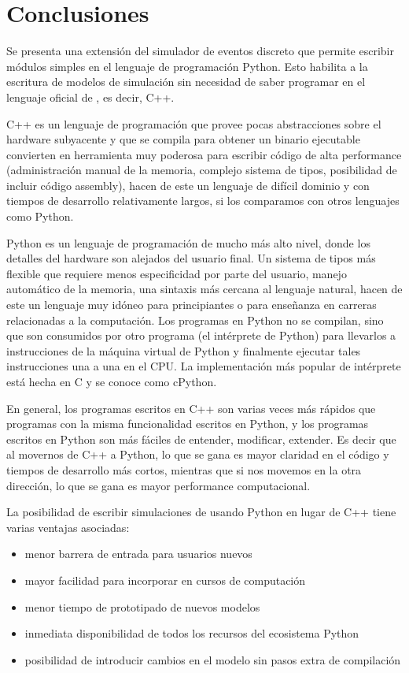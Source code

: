 \chapter{Conclusiones}\label{sec:conc}
Se presenta una extensión del simulador de eventos discreto \omnetpp{} que permite
escribir módulos simples en el lenguaje de programación Python. Esto habilita a
la escritura de modelos de simulación sin necesidad de saber programar en el
lenguaje oficial de \omnetpp{}, es decir, C++.

C++ es un lenguaje de programación que provee pocas abstracciones sobre el
hardware subyacente y que se compila para obtener un binario ejecutable
convierten en herramienta muy poderosa para escribir código de alta performance
(administración manual de la memoria, complejo sistema de tipos, posibilidad de
incluir código assembly), hacen de este un lenguaje de difícil dominio y con
tiempos de desarrollo relativamente largos, si los comparamos con otros
lenguajes como Python.

Python es un lenguaje de programación de mucho más alto nivel, donde los
detalles del hardware son alejados del usuario final. Un sistema de tipos más
flexible que requiere menos especificidad por parte del usuario, manejo
automático de la memoria, una sintaxis más cercana al lenguaje natural, hacen
de este un lenguaje muy idóneo para principiantes o para enseñanza en carreras
relacionadas a la computación. Los programas en Python no se compilan, sino que
son consumidos por otro programa (el intérprete de Python) para llevarlos a
instrucciones de la máquina virtual de Python y finalmente ejecutar tales
instrucciones una a una en el CPU. La implementación más popular de intérprete
está hecha en C y se conoce como cPython.

En general, los programas escritos en C++ son varias veces más rápidos que
programas con la misma funcionalidad escritos en Python, y los programas
escritos en Python son más fáciles de entender, modificar, extender. Es decir
que al movernos de C++ a Python, lo que se gana es mayor claridad en el código
y tiempos de desarrollo más cortos, mientras que si nos movemos en la otra
dirección, lo que se gana es mayor performance computacional.

La posibilidad de escribir simulaciones de \omnetpp{} usando Python en lugar de
C++ tiene varias ventajas asociadas:

\begin{itemize}
    \item menor barrera de entrada para usuarios nuevos

    \item mayor facilidad para incorporar \omnetpp{} en cursos de computación

    \item menor tiempo de prototipado de nuevos modelos

    \item inmediata disponibilidad de todos los recursos del ecosistema Python

    \item posibilidad de introducir cambios en el modelo sin pasos extra de
compilación
\end{itemize}

